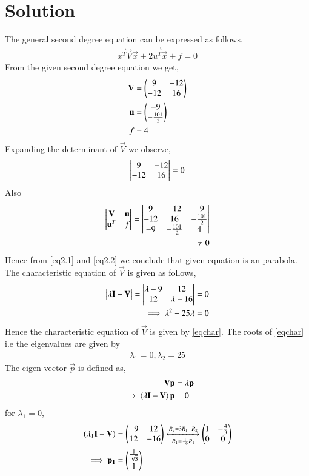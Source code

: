 \documentclass[journal,12pt,twocolumn]{IEEEtran}
\begin{document}
\section{Solution}
The general second degree equation can be expressed as follows,
\begin{align}
\vec{x^T}\vec{V}\vec{x}+2\vec{u^T}\vec{x}+f=0\label{eqmain}
\end{align}
From the given second degree equation we get,
\begin{align}
\mathbf{V} &= \begin{pmatrix}9&-12\\-12&16\end{pmatrix}\\ \label{given1}
\mathbf{u} &= \begin{pmatrix}-9\\-\frac{101}{2}\end{pmatrix}\\ 
f &= 4 \label{given2}
\end{align}
Expanding the determinant of $\vec{V}$ we observe, 
\begin{align}
\begin{vmatrix}9&-12\\-12&16\end{vmatrix} = 0 \label{eq2.1}
\end{align}
Also
\begin{align}
    \begin{vmatrix}\mathbf{V} & \mathbf{u} \\ \mathbf{u}^T & f\end{vmatrix}=
    \begin{vmatrix}9&-12 & -9 \\-12&16 & -\frac{101}{2} \\ -9 & -\frac{101}{2} & 4\end{vmatrix} \\
    \neq 0\label{eq2.2}
\end{align}
Hence from \eqref{eq2.1} and \eqref{eq2.2} we conclude that given equation is an parabola. The characteristic equation of $\vec{V}$ is given as follows,
\begin{align}
\begin{vmatrix}\lambda\mathbf{I}-\mathbf{V}\end{vmatrix} = \begin{vmatrix}\lambda-9&12\\12&\lambda-16\end{vmatrix} &= 0\\
\implies \lambda^2-25\lambda &= 0\label{eqchar}
\end{align}
Hence the characteristic equation of $\vec{V}$ is given by \eqref{eqchar}. The roots of \eqref{eqchar} i.e the eigenvalues are given by
\begin{align}
\lambda_1=0, \lambda_2=25\label{eqeigenvals}    
\end{align}
The eigen vector $\vec{p}$ is defined as, 
\begin{align}
\mathbf{V}\mathbf{p} &= \lambda\mathbf{p}\\
\implies\left(\lambda\mathbf{I}-\mathbf{V}\right)\mathbf{p}&=0 \label{eqev}
\end{align}
for $\lambda_1=0$,
\begin{align}
\left(\lambda_1\mathbf{I}-\mathbf{V}\right)&=\begin{pmatrix}-9&12\\12&-16\end{pmatrix}\xleftrightarrow[R_1=\frac{1}{-9}R_1]{R_2=3R_1-R_2}\begin{pmatrix}1&-\frac{4}{3}\\0&0\end{pmatrix}\\
\implies\mathbf{p_1}&=\begin{pmatrix}\frac{1}{\sqrt{3}}\\1\end{pmatrix} \label{eq2.3}
\end{align}
\end{document}
